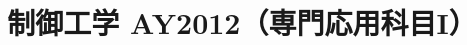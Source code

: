 \documentclass[11pt,a4paper]{article}
\title{制御工学 AY2012（専門応用科目I）}
\author{}
\date{}
\begin{document}
\maketitle


\bigskip

\end{document}
